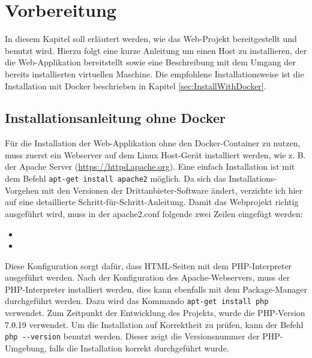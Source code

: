 \chapter{Vorbereitung}
In diesem Kapitel soll erläutert werden, wie das Web-Projekt bereitgestellt und benutzt wird. Hierzu folgt eine kurze Anleitung um einen Host zu installieren, der die Web-Applikation bereitstellt sowie eine Beschreibung mit dem Umgang der bereits installierten virtuellen Maschine. Die empfohlene Installationsweise ist die Installation mit Docker beschrieben in Kapitel \ref{sec:InstallWithDocker}. 

\section{Installationsanleitung ohne Docker}
\label{sec:Install}

Für die Installation der Web-Applikation ohne den Docker-Container zu nutzen, muss zuerst ein Webserver auf dem Linux Host-Gerät installiert werden, wie z. B. der Apache Server (\url{https://httpd.apache.org}). Eine einfach Installation ist mit dem Befehl \colorbox{altgray}{\lstinline|apt-get install apache2|} möglich. Da sich das Installations-Vorgehen mit den Versionen der Drittanbieter-Software ändert, verzichte ich hier auf eine detaillierte Schritt-für-Schritt-Anleitung. Damit das Webprojekt richtig ausgeführt wird, muss in der apache2.conf folgende zwei Zeilen eingefügt werden:\medskip

\begin{itemize}
	\item {}
	\item {}\medskip
\end{itemize}
	
Diese Konfiguration sorgt dafür, dass HTML-Seiten mit dem PHP-Interpreter ausgeführt werden. Nach der Konfiguration des Apache-Webservers, muss der PHP-Interpreter installiert werden, dies kann ebenfalls mit dem Package-Manager durchgeführt werden. Dazu wird das Kommando \colorbox{altgray}{\lstinline|apt-get install php|} verwendet. Zum Zeitpunkt der Entwicklung des Projekts, wurde die PHP-Version 7.0.19 verwendet. Um die Installation auf Korrektheit zu prüfen, kann der Befehl \colorbox{altgray}{\lstinline|php --version|} benutzt werden. Dieser zeigt die Versionsnummer der PHP-Umgebung, falls die Installation korrekt durchgeführt wurde.\medskip

